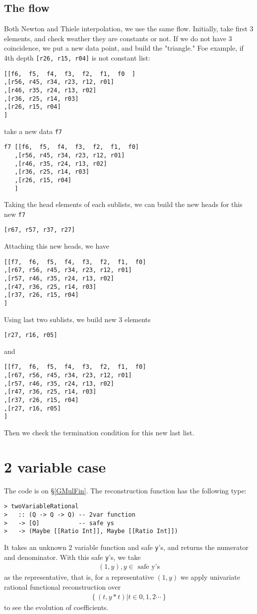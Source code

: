 \documentclass[11pt]{book}
\begin{document}
\subsection{The flow}
Both Newton and Thiele interpolation, we use the same flow.
Initially, take first 3 elements, and check weather they are constants or not.
If we do not have 3 coincidence, we put a new data point, and build the "triangle."
Foe example, if 4th depth \verb+[r26, r15, r04]+ is not constant list:
\begin{verbatim}
[[f6,  f5,  f4,  f3,  f2,  f1,  f0  ]
,[r56, r45, r34, r23, r12, r01]
,[r46, r35, r24, r13, r02]
,[r36, r25, r14, r03]
,[r26, r15, r04]
]
\end{verbatim}
take a new data \verb+f7+
\begin{verbatim}
f7 [[f6,  f5,  f4,  f3,  f2,  f1,  f0]
   ,[r56, r45, r34, r23, r12, r01]
   ,[r46, r35, r24, r13, r02]
   ,[r36, r25, r14, r03]
   ,[r26, r15, r04]
   ] 
\end{verbatim}
Taking the head elements of each sublists, we can build the new heads for this new \verb+f7+
\begin{verbatim}
[r67, r57, r37, r27]
\end{verbatim}
Attaching this new heads, we have
\begin{verbatim}
[[f7,  f6,  f5,  f4,  f3,  f2,  f1,  f0]
,[r67, r56, r45, r34, r23, r12, r01]
,[r57, r46, r35, r24, r13, r02]
,[r47, r36, r25, r14, r03]
,[r37, r26, r15, r04]
]
\end{verbatim}
Using last two sublists, we build new 3 elements
\begin{verbatim}
[r27, r16, r05]
\end{verbatim}
and 
\begin{verbatim}
[[f7,  f6,  f5,  f4,  f3,  f2,  f1,  f0]
,[r67, r56, r45, r34, r23, r12, r01]
,[r57, r46, r35, r24, r13, r02]
,[r47, r36, r25, r14, r03]
,[r37, r26, r15, r04]
,[r27, r16, r05]
]
\end{verbatim}
Then we check the termination condition for this new last list.

\section{2 variable case}
The code is on \S\ref{GMulFin}.
The reconstruction function has the following type:
\begin{verbatim}
> twoVariableRational
>   :: (Q -> Q -> Q) -- 2var function
>   -> [Q]           -- safe ys
>   -> (Maybe [[Ratio Int]], Maybe [[Ratio Int]]) 
\end{verbatim}
It takes an unknown 2 variable function and safe \verb+y+'s, and returns the numerator and denominator.
With this safe \verb+y+'s, we take
\begin{eqnarray}
(1,y), y \in \text{ safe y's}
\end{eqnarray}
as the representative, that is, for a representative $(1,y)$ we apply univariate rational functional reconstruction over
\begin{eqnarray}
\left\{\left. (t,y*t)  \right| t \in 0,1,2 \cdots \right\}
\end{eqnarray}
to see the evolution of coefficients.
\end{document}
